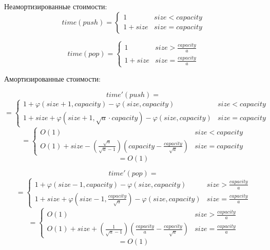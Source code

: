 \documentclass{article}
\renewcommand{\phi}{\varphi}  %
\begin{document}
Неамортизированные стоимости:
\begin{equation*}
time(push) = \begin{cases} 
      1 & size < capacity \\
      1 + size & size = capacity 
   \end{cases}
\end{equation*}

\begin{equation*}
time(pop) = \begin{cases} 
      1 & size > \frac{capacity}{a} \\
      1 + size & size = \frac{capacity}{a} 
   \end{cases}
\end{equation*}

Амортизированные стоимости:

\begin{equation*}
time'(push) =
\end{equation*}
\begin{equation*}
=\begin{cases} 
      1 + \phi (size + 1, capacity) - \phi (size, capacity)& size < capacity \\
      1 + size +\phi (size + 1, \sqrt{a}\cdot capacity) - \phi (size, capacity)&  size = capacity 
   \end{cases}
\end{equation*}
\begin{equation*}
 =\begin{cases} 
      O(1) & size < capacity \\
      O(1) + size - \left(\frac{\sqrt{a}}{\sqrt{a} - 1}\right) \left(capacity-\frac{capacity}{\sqrt{a}}\right)&  size = capacity 
   \end{cases}
  \end{equation*}
$$=O(1)$$

\begin{equation*}
time'(pop) =
\end{equation*}
\begin{equation*}
=\begin{cases} 
      1 + \phi (size - 1, capacity) - \phi (size, capacity)& size > \frac{capacity}{a} \\
      1 + size + \phi (size - 1, \frac{capacity}{\sqrt{a}} ) - \phi (size, capacity)& size = \frac{capacity}{a} 
   \end{cases}
\end{equation*}
\begin{equation*}
 =\begin{cases} 
      O(1) & size > \frac{capacity}{a} \\
      O(1) + size + \left(\frac{1}{\sqrt{a} - 1}\right) \left( \frac{capacity}{a} - \frac{capacity}{\sqrt{a}}\right)&  size = \frac{capacity}{a}
   \end{cases}
  \end{equation*}
$$=O(1)$$
\end{document}

